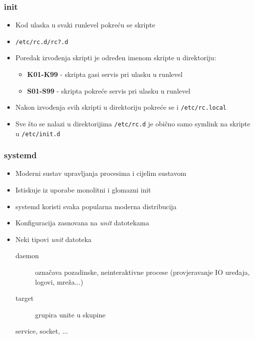 \documentclass[t]{beamer}
\begin{document}
\begin{frame}
	\frametitle{init}
	\begin{itemize}
		\item Kod ulaska u svaki runlevel pokreću se skripte
		\item[] \texttt{/etc/rc.d/rc?.d}
		\item Poredak izvođenja skripti je određen imenom skripte u direktoriju:
		\begin{itemize}
			\item[] \textbf{K01-K99} - skripta gasi servis pri ulasku u runlevel
			\item[] \textbf{S01-S99} - skripta pokreće servis pri ulasku u runlevel
		\end{itemize}
		\item Nakon izvođenja svih skripti u direktoriju pokreće se i \texttt{/etc/rc.local}
		\item Sve što se nalazi u direktorijima \texttt{/etc/rc.d} je obično samo symlink na skripte u \texttt{/etc/init.d}

	\end{itemize}
\end{frame}




\begin{frame}
	\frametitle{systemd}
	\begin{itemize}
		\item Moderni sustav upravljanja procesima i cijelim sustavom
		\item Istiskuje iz uporabe monolitni i glomazni init 
		\item systemd koristi svaka popularna moderna distribucija
	\end{itemize}
	\begin{itemize}
		\item Konfiguracija zasnovana na \emph{unit} datotekama
		\item Neki tipovi \emph{unit} datoteka
		\begin{description}
			\item[daemon] označava pozadinske, neinteraktivne procese (provjeravanje IO uređaja, logovi, mreža...)
			\item[target] grupira unite u skupine
			\item[service, socket, ...]
		\end{description}
	\end{itemize}
\end{frame}
\end{document}
